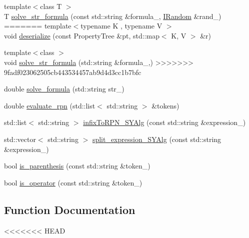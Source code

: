 \begin{DoxyCompactItemize}
\item 
{\footnotesize template$<$class T $>$ }\\T \hyperlink{namespaceserialize_aa5ee0bad0c960a3f06430066217d8c12}{solve\+\_\+str\+\_\+formula} (const std\+::string \&formula\+\_\+, \hyperlink{classsolar__core_1_1_i_random}{I\+Random} \&rand\+\_\+)
=======
{\footnotesize template$<$typename K , typename V $>$ }\\void \hyperlink{namespaceserialize_af7e18cf15b955d078b7fc036042cb083}{deserialize} (const Property\+Tree \&pt, std\+::map$<$ K, V $>$ \&r)
\item 
{\footnotesize template$<$class $>$ }\\void \hyperlink{namespaceserialize_a2c1ea7730402ca3407bced2235efe3fd}{solve\+\_\+str\+\_\+formula} (std\+::string \&formula\+\_\+,)
>>>>>>> 9fadf023062505cb443534457ab9d4d3cc1b7bfc
\end{DoxyCompactItemize}
{\bf }\par
\begin{DoxyCompactItemize}
\item 
double \hyperlink{namespaceserialize_a8efbe7c32352f8ff750211235e3d5361}{solve\+\_\+formula} (std\+::string str\+\_\+)
\item 
double \hyperlink{namespaceserialize_ade99c17935e107385ad259ba3111457e}{evaluate\+\_\+rpn} (std\+::list$<$ std\+::string $>$ \&tokens)
\item 
std\+::list$<$ std\+::string $>$ \hyperlink{namespaceserialize_a2876e5d84edeaa969e25a176eb582bb3}{infix\+To\+R\+P\+N\+\_\+\+S\+Y\+Alg} (const std\+::string \&expression\+\_\+)
\item 
std\+::vector$<$ std\+::string $>$ \hyperlink{namespaceserialize_a06d144912d025816fe84c532295d274a}{split\+\_\+expression\+\_\+\+S\+Y\+Alg} (const std\+::string \&expression\+\_\+)
\item 
bool \hyperlink{namespaceserialize_a38acccd96ada5f0927f924531ac1498e}{is\+\_\+parenthesis} (const std\+::string \&token\+\_\+)
\item 
bool \hyperlink{namespaceserialize_a897be0f6c9fe37021e11bfeb732d3500}{is\+\_\+operator} (const std\+::string \&token\+\_\+)
\end{DoxyCompactItemize}



\subsection{Function Documentation}
<<<<<<< HEAD
\hypertarget{namespaceserialize_a4c500beb6e6b8eb1c9e62376d3f5ce83}{}
